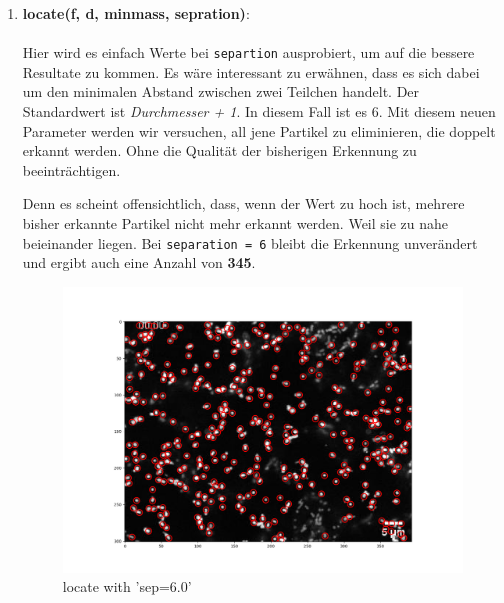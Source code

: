 \begin{enumerate}
		\item {\Large \textbf{locate(f, d, minmass, sepration)}}: \\ \\
    			Hier wird es einfach Werte bei \texttt{separtion} ausprobiert, um auf die bessere Resultate zu kommen. 
    			Es wäre interessant zu erwähnen, dass es sich dabei um den minimalen Abstand zwischen zwei Teilchen handelt. Der Standardwert ist \textit{Durchmesser + 1}. In diesem Fall ist es 6. 
Mit diesem neuen Parameter werden wir versuchen, all jene Partikel zu eliminieren, die doppelt erkannt werden. Ohne die Qualität der bisherigen Erkennung zu beeinträchtigen.  

Denn es scheint offensichtlich, dass, wenn der Wert zu hoch ist, mehrere bisher erkannte Partikel nicht mehr erkannt werden. Weil sie zu nahe beieinander liegen.
Bei \texttt{separation = 6} bleibt die Erkennung unverändert und ergibt auch eine Anzahl von \textbf{345}.

\begin{figure}[H]
    \centering
    \includegraphics[scale=0.35]{Grafiken/trackpyBilder/locate_with_separation_(6).png}
    \caption{locate with 'sep=6.0'}
\end{figure}


\end{enumerate}
